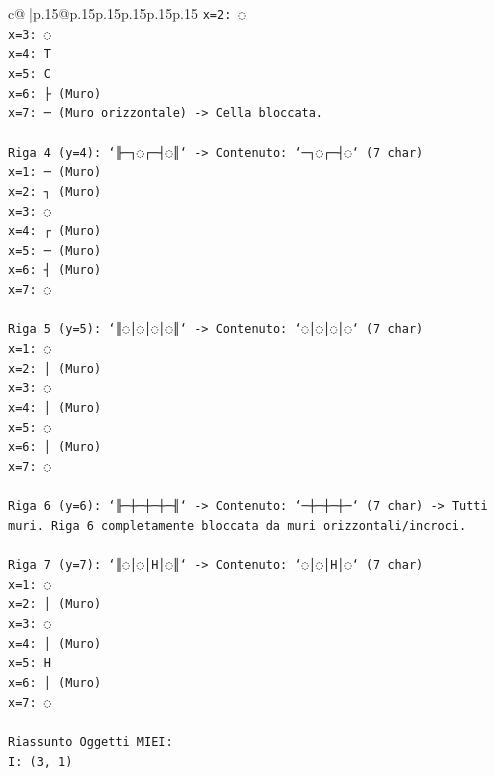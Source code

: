 \documentclass{article}
\begin{document}
{\begin{supertabular}{c@{$\;$}|p{.15\linewidth}@{}p{.15\linewidth}p{.15\linewidth}p{.15\linewidth}p{.15\linewidth}p{.15\linewidth}}
{{{\texttt{x=2: ◌} \\
\texttt{x=3: ◌} \\
\texttt{x=4: T} \\
\texttt{x=5: C} \\
\texttt{x=6: ├ (Muro)} \\
\texttt{x=7: ─ (Muro orizzontale) {-}> Cella bloccata.} \\
\\ 
\texttt{Riga 4 (y=4): `╟─┐◌┌─┤◌║` {-}> Contenuto: `─┐◌┌─┤◌` (7 char)} \\
\texttt{x=1: ─ (Muro)} \\
\texttt{x=2: ┐ (Muro)} \\
\texttt{x=3: ◌} \\
\texttt{x=4: ┌ (Muro)} \\
\texttt{x=5: ─ (Muro)} \\
\texttt{x=6: ┤ (Muro)} \\
\texttt{x=7: ◌} \\
\\ 
\texttt{Riga 5 (y=5): `║◌│◌│◌│◌║` {-}> Contenuto: `◌│◌│◌│◌` (7 char)} \\
\texttt{x=1: ◌} \\
\texttt{x=2: │ (Muro)} \\
\texttt{x=3: ◌} \\
\texttt{x=4: │ (Muro)} \\
\texttt{x=5: ◌} \\
\texttt{x=6: │ (Muro)} \\
\texttt{x=7: ◌} \\
\\ 
\texttt{Riga 6 (y=6): `╟─┼─┼─┼─╢` {-}> Contenuto: `─┼─┼─┼─` (7 char) {-}> Tutti muri. Riga 6 completamente bloccata da muri orizzontali/incroci.} \\
\\ 
\texttt{Riga 7 (y=7): `║◌│◌│H│◌║` {-}> Contenuto: `◌│◌│H│◌` (7 char)} \\
\texttt{x=1: ◌} \\
\texttt{x=2: │ (Muro)} \\
\texttt{x=3: ◌} \\
\texttt{x=4: │ (Muro)} \\
\texttt{x=5: H} \\
\texttt{x=6: │ (Muro)} \\
\texttt{x=7: ◌} \\
\\ 
\texttt{Riassunto Oggetti MIEI:} \\
\texttt{I: (3, 1)} \\
}}}
\end{supertabular}}
\end{document}
